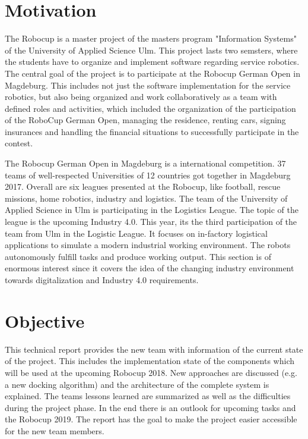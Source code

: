 \section{Motivation}

The Robocup is a master project of the masters program "Information Systems" of the University of Applied Science Ulm. This project lasts two semsters, where the students have to organize and implement software regarding service robotics. The central goal of the project is to participate at the Robocup German Open in Magdeburg. This includes not just the software implementation for the service robotics, but also being organized and work collaboratively as a team with defined roles and activities, which included the organization of the participation of the RoboCup German Open, managing the residence, renting cars, signing insurances and handling the financial situations to successfully participate in the contest. 

The Robocup German Open in Magdeburg is a international competition. 37 teams of well-respected Universities of 12 countries got together in Magdeburg 2017. Overall are six leagues presented at the Robocup, like football, rescue missions, home robotics, industry and logistics. The team of the University of Applied Science in Ulm is participating in the Logistics League. The topic of the league is the upcoming Industry 4.0. This year, its the third participation of the team from Ulm in the Logistic League. It focuses on in-factory logistical applications to simulate a modern industrial working environment. The robots autonomously fulfill tasks and produce working output. This section is of enormous interest since it covers the idea of the changing industry environment towards digitalization and Industry 4.0 requirements. 

\section{Objective}

This technical report provides the new team with information of the current state of the project. This includes the implementation state of the components which will be used at the upcoming Robocup 2018. New approaches are discussed (e.g. a new docking algorithm) and the architecture of the complete system is explained. The teams lessons learned are summarized as well as the difficulties during the project phase. In the end there is an outlook for upcoming tasks and the Robocup 2019.
The report has the goal to make the project easier accessible for the new team members.  
